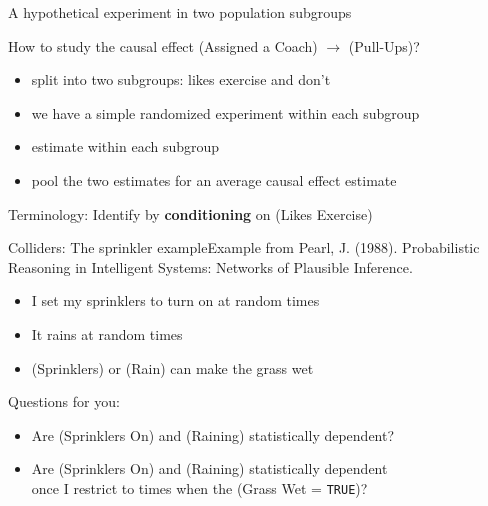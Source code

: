 \documentclass{beamer}
\begin{document}
\begin{frame}{A hypothetical experiment in two population subgroups}
\begin{center}
\end{center}
How to study the causal effect (Assigned a Coach) $\rightarrow$ (Pull-Ups)? \pause
\begin{itemize}
\item split into two subgroups: likes exercise and don't \pause
\item we have a simple randomized experiment within each subgroup \pause
\item estimate within each subgroup \pause
\item pool the two estimates for an average causal effect estimate \pause
\end{itemize}
Terminology: Identify by \textbf{conditioning} on (Likes Exercise)
\end{frame}

\begin{frame}{Colliders: The sprinkler example}{Example from Pearl, J. (1988). Probabilistic Reasoning in Intelligent Systems: Networks of Plausible Inference.} \pause
\begin{itemize}
\item I set my sprinklers to turn on at random times \pause
\item It rains at random times \pause
\item (Sprinklers) or (Rain) can make the grass wet
\end{itemize} \pause
\begin{center}
\end{center} \pause
Questions for you:
\begin{itemize}
\item Are (Sprinklers On) and (Raining) statistically dependent?
\item Are (Sprinklers On) and (Raining) statistically dependent\\once I restrict to times when the (Grass Wet = \texttt{TRUE})?
\end{itemize}

\end{frame}
\end{document}
